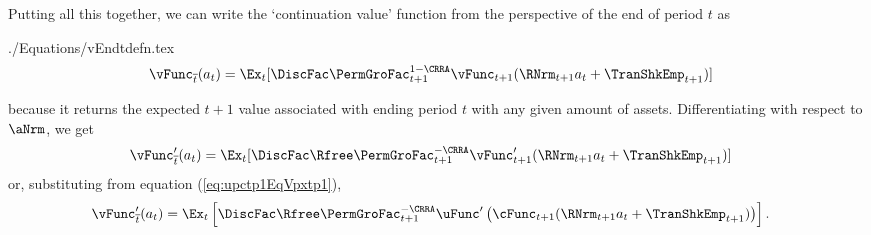 \documentclass[titlepage, headings=optiontotocandhead]{\econtex}
\begin{document}

Putting all this together, we can write the `continuation value' function from the perspective of the end of period $t$ as 
\begin{verbatimwrite}{./Equations/vEndtdefn.tex}
  \begin{equation}\begin{gathered}\begin{aligned}
        \vEOPt({a}_{t})  & = \Ex_{t}[\DiscFac \PermGroFac_{t+1}^{1-\CRRA}\null{\vFunc}_{t+1}(\RNrm_{t+1} {a}_{t}+{\TranShkEmp}_{t+1})]  \label{eq:vEndtdefn}
      \end{aligned}\end{gathered}\end{equation}
\end{verbatimwrite}
\unskip
because it returns the expected $t+1$ value associated with ending period $t$ with any given amount of assets.  Differentiating with respect to $\aNrm$, we get 
\begin{equation}\begin{gathered}\begin{aligned}
      {\vPEOPt}({a}_{t})  & = \Ex_{t}[\DiscFac \Rfree \PermGroFac_{t+1}^{-\CRRA} \null{\vFunc}_{t+1}^{\prime}(\RNrm_{t+1}{a}_{t}+{\TranShkEmp}_{t+1})]  \label{eq:vEndPrimetdefn}
    \end{aligned}\end{gathered}\end{equation}
or, substituting from equation (\ref{eq:upctp1EqVpxtp1}),
\begin{equation}\begin{gathered}\begin{aligned}
      \vPEOPt({a}_{t})  & = \Ex_{t}\left[\DiscFac \Rfree \PermGroFac_{t+1}^{-\CRRA} \uFunc^{\prime}\left(\cFunc_{t+1}(\RNrm_{t+1} {a}_{t}+{\TranShkEmp}_{t+1})\right)\right].  \label{eq:vEndPrimetOfc}
    \end{aligned}\end{gathered}\end{equation}
\end{document}
